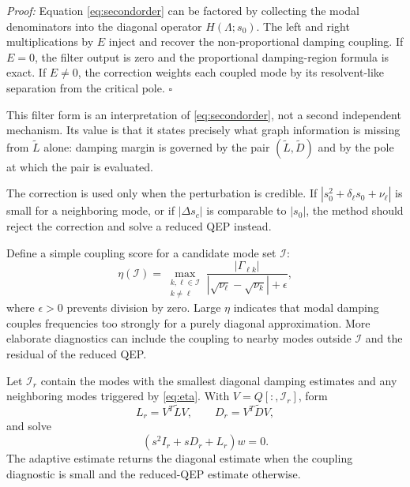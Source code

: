 \documentclass[journal]{IEEEtran}
\newcommand{\Lt}{\widetilde L}
\newcommand{\Dt}{\widetilde D}
\begin{document}
\emph{Proof:}
Equation \eqref{eq:secondorder} can be factored by collecting the modal denominators into the diagonal operator $H(\Lambda;s_0)$. The left and right multiplications by $E$ inject and recover the non-proportional damping coupling. If $E=0$, the filter output is zero and the proportional damping-region formula is exact. If $E\neq0$, the correction weights each coupled mode by its resolvent-like separation from the critical pole. \hfill$\square$

This filter form is an interpretation of \eqref{eq:secondorder}, not a second independent mechanism. Its value is that it states precisely what graph information is missing from $\Lt$ alone: damping margin is governed by the pair $(\Lt,\Dt)$ and by the pole at which the pair is evaluated.

The correction is used only when the perturbation is credible. If $|s_0^2+\delta_\ell s_0+\nu_\ell|$ is small for a neighboring mode, or if $|\Delta s_c|$ is comparable to $|s_0|$, the method should reject the correction and solve a reduced QEP instead.

Define a simple coupling score for a candidate mode set $\mathcal{I}$:
\begin{equation}
\eta(\mathcal{I})=\max_{\substack{k,\ell\in\mathcal{I}\\k\neq \ell}}
\frac{|\Gamma_{\ell k}|}{|\sqrt{\nu_\ell}-\sqrt{\nu_k}|+\epsilon},
\label{eq:eta}
\end{equation}
where $\epsilon>0$ prevents division by zero. Large $\eta$ indicates that modal damping couples frequencies too strongly for a purely diagonal approximation. More elaborate diagnostics can include the coupling to nearby modes outside $\mathcal{I}$ and the residual of the reduced QEP.

Let $\mathcal{I}_r$ contain the modes with the smallest diagonal damping estimates and any neighboring modes triggered by \eqref{eq:eta}. With $V=Q[:,\mathcal{I}_r]$, form
\begin{equation}
L_r=V^T\Lt V,\qquad D_r=V^T\Dt V,
\end{equation}
and solve
\begin{equation}
(s^2I_r+sD_r+L_r)w=0.
\label{eq:rqep}
\end{equation}
The adaptive estimate returns the diagonal estimate when the coupling diagnostic is small and the reduced-QEP estimate otherwise.
\end{document}
